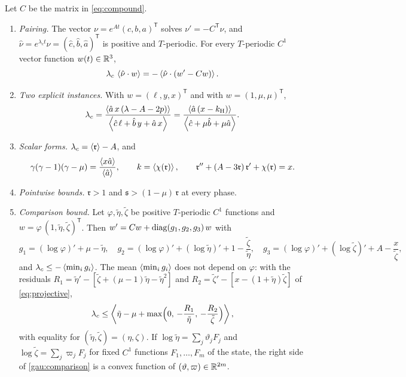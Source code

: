 \begin{proposition}\label{prop:strongidentity}
Let $C$ be the matrix in \eqref{eq:compound}.
\begin{enumerate}[label=(\roman*)]
\item \emph{Pairing.} The vector $\nu=e^{At}(c,b,a)^{\mathsf T}$ solves $\nu'=-C^{\mathsf T}\nu$, and $\hat\nu=e^{\lambda_ct}\nu=(\hat c,\hat b,\hat a)^{\mathsf T}$ is positive and $T$-periodic. For every $T$-periodic $C^1$ vector function $w(t)\in\mathbb R^3$,
\begin{equation}\label{gau:pairing}
\lambda_c\,\left\langle \hat\nu\cdot w\right\rangle=-\left\langle \hat\nu\cdot(w'-Cw)\right\rangle .
\end{equation}
\item \emph{Two explicit instances.} With $w=(\ell,y,x)^{\mathsf T}$ and with $w=(1,\mu,\mu)^{\mathsf T}$,
\begin{equation}\label{gau:strongformulas}
\lambda_c=\frac{\left\langle \hat a\,x\,(\lambda-A-2p)\right\rangle}{\left\langle \hat c\,\ell+\hat b\,y+\hat a\,x\right\rangle}
=\frac{\left\langle \hat a\,(x-k_{\mathrm H})\right\rangle}{\left\langle \hat c+\mu\hat b+\mu\hat a\right\rangle} .
\end{equation}
\item \emph{Scalar forms.} $\lambda_c=\left\langle \mathfrak r\right\rangle-A$, and
\begin{equation}\label{gau:chiidentities}
\gamma(\gamma-1)(\gamma-\mu)=\frac{\left\langle x\hat a\right\rangle}{\left\langle \hat a\right\rangle},\qquad k=\left\langle \chi(\mathfrak r)\right\rangle,\qquad
\mathfrak r''+(A-3\mathfrak r)\,\mathfrak r'+\chi(\mathfrak r)=x .
\end{equation}
\item \emph{Pointwise bounds.} $\mathfrak r>1$ and $\mathfrak s>(1-\mu)\,\mathfrak r$ at every phase.
\item \emph{Comparison bound.} Let $\varphi,\tilde\eta,\tilde\zeta$ be positive $T$-periodic $C^1$ functions and $w=\varphi\,(1,\tilde\eta,\tilde\zeta)^{\mathsf T}$. Then $w'=Cw+\operatorname{diag}(g_1,g_2,g_3)\,w$ with
\begin{equation}\label{gau:defects}
g_1=(\log\varphi)'+\mu-\tilde\eta,\quad
g_2=(\log\varphi)'+(\log\tilde\eta)'+1-\frac{\tilde\zeta}{\tilde\eta},\quad
g_3=(\log\varphi)'+(\log\tilde\zeta)'+A-\frac{x}{\tilde\zeta},
\end{equation}
and $\lambda_c\le-\left\langle \min_ig_i\right\rangle$. The mean $\left\langle \min_ig_i\right\rangle$ does not depend on $\varphi$: with the residuals $R_1=\tilde\eta'-[\tilde\zeta+(\mu-1)\tilde\eta-\tilde\eta^2]$ and $R_2=\tilde\zeta'-[x-(1+\tilde\eta)\tilde\zeta]$ of \eqref{eq:projective},
\begin{equation}\label{gau:comparison}
\lambda_c\le\left\langle \tilde\eta-\mu+\max\Bigl(0,\,-\frac{R_1}{\tilde\eta},\,-\frac{R_2}{\tilde\zeta}\Bigr)\right\rangle,
\end{equation}
with equality for $(\tilde\eta,\tilde\zeta)=(\eta,\zeta)$. If $\log\tilde\eta=\sum_j\vartheta_jF_j$ and $\log\tilde\zeta=\sum_j\varpi_jF_j$ for fixed $C^1$ functions $F_1,\dots,F_m$ of the state, the right side of \eqref{gau:comparison} is a convex function of $(\vartheta,\varpi)\in\mathbb R^{2m}$.
\end{enumerate}
\end{proposition}

